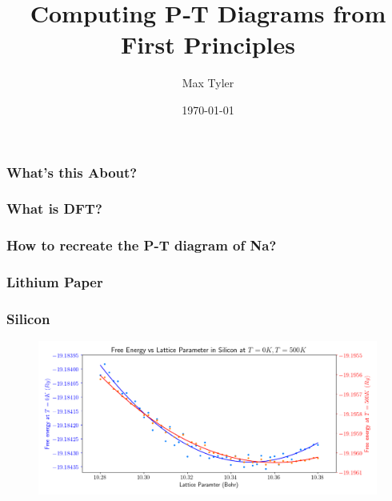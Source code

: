 \documentclass{beamer}
\title{Computing P‐T Diagrams from First Principles}
\author{Max Tyler}
\institute{The University of Edinburgh}
\date{\today}
\begin{document}
 
\frame{\titlepage}
 
\begin{frame}
	\frametitle{What's this About?}
\end{frame}

\begin{frame}
	\frametitle{What is DFT?}
\end{frame}

\begin{frame}
	\frametitle{How to recreate the P-T diagram of Na?}
\end{frame}

\begin{frame}
	\frametitle{Lithium Paper}
\end{frame}
 
\begin{frame}
	\frametitle{Silicon}
	\begin{figure}[ht]
	\begin{center}
	\includegraphics[height=2in]{silicon_0_500_comparison.png}
	\end{center}
	\end{figure}
\end{frame}
\end{document}
